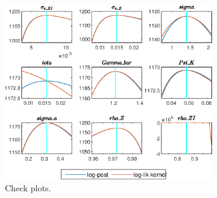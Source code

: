  
\begin{figure}[H]
\centering 
\includegraphics[width=0.80\textwidth]{two_sector_RBC_differentiated_est/graphs/two_sector_RBC_differentiated_est_CheckPlots1}
\caption{Check plots.}\label{Fig:CheckPlots:1}
\end{figure}
 
